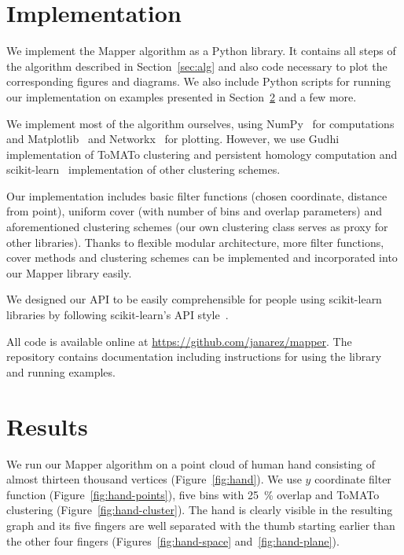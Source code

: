 \documentclass{article}
\begin{document}
\section{Implementation}\label{sec:impl}

We implement the Mapper algorithm as a Python library.
It contains all steps of the algorithm described in Section~\ref{sec:alg} and also code necessary to plot the corresponding figures and diagrams.
We also include Python scripts for running our implementation on examples presented in Section~\ref{sec:res} and a few more.

We implement most of the algorithm ourselves, using NumPy~\cite{numpy} for computations and Matplotlib~\cite{matplotlib} and Networkx~\cite{networkx} for plotting.
However, we use Gudhi~\cite{gudhi} implementation of ToMATo clustering and persistent homology computation and scikit-learn~\cite{scikit} implementation of other clustering schemes.

Our implementation includes basic filter functions (chosen coordinate, distance
from point), uniform cover (with number of bins and overlap parameters) and
aforementioned clustering schemes (our own clustering class serves as proxy for other libraries). Thanks to
flexible modular architecture, more filter functions, cover methods and
clustering schemes can be implemented and incorporated into our Mapper library
easily.

We designed our API to be easily comprehensible for people using scikit-learn libraries by following scikit-learn's API style~\cite{scikitAPI}.

All code is available online at \url{https://github.com/janarez/mapper}.
The repository contains documentation including instructions for using the library and running examples.

\section{Results}\label{sec:res}

We run our Mapper algorithm on a point cloud of human hand consisting of almost thirteen thousand vertices (Figure~\ref{fig:hand}).
We use $y$ coordinate filter function (Figure~\ref{fig:hand-points}), five bins with 25~\% overlap and ToMATo clustering (Figure~\ref{fig:hand-cluster}).
The hand is clearly visible in the resulting graph and its five fingers are well separated with the thumb starting earlier than the other four fingers (Figures~\ref{fig:hand-space} and~\ref{fig:hand-plane}).
\end{document}
